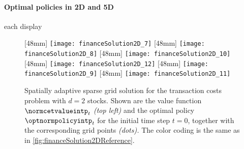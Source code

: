 \paragraph{Optimal policies in 2D and 5D}

each display
\begin{figure}
  [48mm]{%
    \texttt{[image: financeSolution2D\_7]}%
  }%
  \hfill%
  [48mm]{%
    \texttt{[image: financeSolution2D\_8]}%
  }%
  \hfill%
  [48mm]{%
    \texttt{[image: financeSolution2D\_10]}%
  }%
  \\[2mm]%
  [48mm]{%
    \texttt{[image: financeSolution2D\_12]}%
  }%
  \hfill%
  [48mm]{%
    \texttt{[image: financeSolution2D\_9]}%
  }%
  \hfill%
  [48mm]{%
    \texttt{[image: financeSolution2D\_11]}%
  }%
  \caption[Sparse grid solution for the two-dimensional TCP]{%
    Spatially adaptive sparse grid solution for the transaction costs problem
    \vspace{-0.15em}%
    with $d = 2$ stocks.
    \vspace{-0.15em}%
    Shown are the value function $\normcetvalueintp_t$ \emph{(top left)} and the
    optimal policy $\optnormpolicyintp_t$ for the initial time step $t = 0$,
    together with the corresponding grid points \emph{(dots).}
    The color coding is the same as in
    \cref{fig:financeSolution2DReference}.%
  }%
  \label{fig:financeSolution2DSparseGrid}%
\end{figure}%
